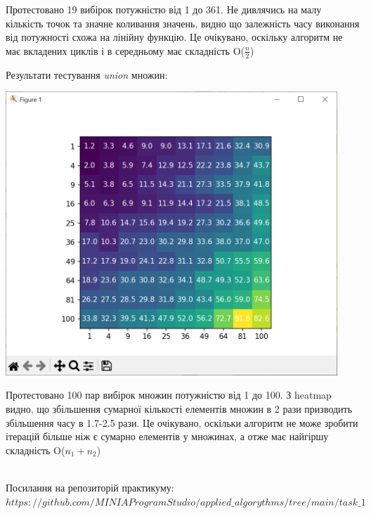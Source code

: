 \documentclass{article}
\begin{document}
Протестовано 19 вибірок потужністю від 1 до 361. Не дивлячись на малу кількість точок та значне коливання значень, видно що залежність часу виконання від потужності схожа на лінійну функцію. Це очікувано, оскільку алгоритм не має вкладених циклів і в середньому має складність O($\frac{n}{2}$)\\\indent

Результати тестування \textit{union} множин:\\\indent

\begin{center}
    \includegraphics[width=125mm]{union}
\end{center}

Протестовано 100 пар вибірок множин потужністю від 1 до 100. З heatmap видно, що збільшення сумарної кількості елементів множин в 2 рази призводить збільшення часу в 1.7-2.5 рази. Це очікувано, оскільки алгоритм не може зробити ітерацій більше ніж є сумарно елементів у множинах, а отже має найгіршу складність O($n_1 + n_2$)\\\\\indent

Посилання на репозиторій практикуму:\\ \href{$https://github.com/MINIAProgramStudio/applied_algorythms/tree/main/task_1$}{$https://github.com/MINIAProgramStudio/applied\_algorythms/tree/main/task\_1$}\sloppy

   
\end{document}
